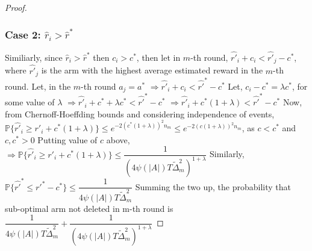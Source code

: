 \begin{proof}
\subsubsection*{\textbf{Case 2: $\hat{r}_{i} > \hat{r}^{*}$}}
Similiarly, since $\hat{r}_{i} > \hat{r}^{*}$ then $c_{i}>c^{*}$,
\newline
then let in $m$-th round,
\newline 
\hspace*{8em}$\hat{r'}_{i}+c_{i}<\hat{r'}_{j}-c^{*}$, where $\hat{r'}_{j}$ is the arm with the highest average estimated reward in the $m$-th round. 
\newline
Let, in the $m$-th round $a_{j}=a^{*}$
\newline
\hspace*{8em}$\Rightarrow \hat{r'}_{i}+c_{i}<\hat{r'}^{*}-c^{*} $
\newline
Let, $c_{i}-c^{*}=\lambda c^{*}$, for some value of $\lambda $
\newline
\hspace*{8em}$\Rightarrow \hat{r'}_{i} + c^{*} + \lambda c^{*} < \hat{r'}^{*}-c^{*} $
\newline
\hspace*{8em}$\Rightarrow \hat{r'}_{i} + c^{*}( 1 + \lambda) < \hat{r'}^{*}-c^{*} $
\newline
Now, from Chernoff-Hoeffding bounds and considering independence of events,
\newline 
$\mathbb{P}\lbrace\hat{r'}_{i} \geq r'_{i} + c^{*}( 1 + \lambda)\rbrace \leq e^{-2(c^{*}(1+\lambda))^{2}n_{m}}\leq e^{-2(c(1+\lambda))^{2}n_{m}}$, as $c<c^{*}$ and $c,c^{*} > 0 $
\newline Putting value of $c$ above,
\newline\hspace*{8em} $\Rightarrow \mathbb{P} \lbrace  \hat{r'}_{i} \geq r'_{i} + c^{*}( 1 + \lambda) \rbrace \leq \dfrac{1}{(4\psi(|A|)T\tilde{\Delta}_{m}^{2})^{1+\lambda}}$
\newline Similarly, $\mathbb{P} \lbrace \hat{r'}^{*} \leq r'^{*} - c^{*} \rbrace\leq \dfrac{1}{4\psi(|A|)T\tilde{\Delta}_{m}^{2}}$
\newline
Summing the two up, the probability that sub-optimal arm not deleted in m-th round is $\dfrac{1}{4\psi(|A|)T\tilde{\Delta}_{m}^{2}} + \dfrac{1}{(4\psi(|A|)T\tilde{\Delta}_{m}^{2})^{1+\lambda}}$
\newline

\end{proof}
